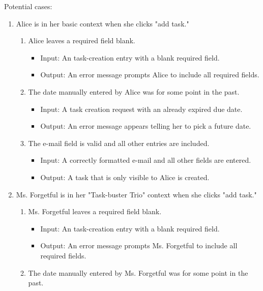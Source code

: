 \documentclass{article}
\begin{document}
Potential cases:
\begin{enumerate}
    \item Alice is in her basic context when she clicks "add task."
    \begin{enumerate}
        \item Alice leaves a required field blank.
            \begin{itemize}
                \item Input: An task-creation entry with a blank required
field.
                \item Output: An error message prompts Alice to include all required fields.
            \end{itemize}
        \item The date manually entered by Alice was for some point in the past.
            \begin{itemize}
                \item Input: A task creation request with an already expired due date.
                \item Output: An error message appears telling her to pick a future date.
            \end{itemize}
        \item The e-mail field is valid and all other entries are included.
            \begin{itemize}
                \item Input: A correctly formatted e-mail and all other fields
are entered.
                \item Output: A task that is only visible to Alice is
created.
            \end{itemize}
    \end{enumerate}
\item Ms. Forgetful is in her "Task-buster Trio" context when she clicks "add
task."
     \begin{enumerate}
        \item Ms. Forgetful leaves a required field blank.
            \begin{itemize}
                \item Input: An task-creation entry with a blank required
field.
                \item Output: An error message prompts Ms. Forgetful to
include all required fields.
            \end{itemize}
        \item The date manually entered by Ms. Forgetful was for some point in
the past.

\end{enumerate}
\end{enumerate}
\end{document}
